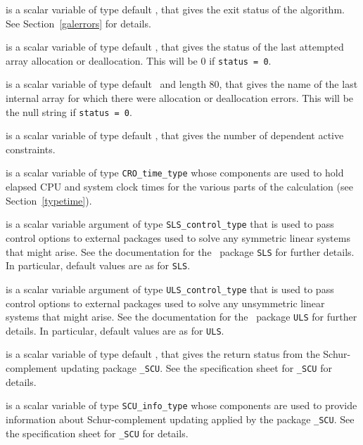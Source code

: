 \documentclass{galahad}
\newcommand{\packagename}{CRO}
\begin{document}
\begin{description}

 is a scalar variable of type default \integer, that gives the
exit status of the algorithm.
See Section~\ref{galerrors}
for details.

 is a scalar variable of type default \integer, that gives
the status of the last attempted array allocation or deallocation.
This will be 0 if {\tt status = 0}.

 is a scalar variable of type default \character\
and length 80, that  gives the name of the last internal array
for which there were allocation or deallocation errors.
This will be the null string if {\tt status = 0}.

 is a scalar variable of type default \integer, that
gives the number of dependent active constraints.

 is a scalar variable of type {\tt \packagename\_time\_type}
whose components are used to hold elapsed CPU and system clock times for the
various parts of the calculation (see Section~\ref{typetime}).

 is a scalar variable argument of type
{\tt SLS\_control\_type} that is used to pass control
options to external packages used to solve any symmetric
linear systems that might arise.
See the documentation for the \galahad\ package {\tt SLS} for further details.
In particular, default values are as for {\tt SLS}.

 is a scalar variable argument of type
{\tt ULS\_control\_type} that is used to pass control
options to external packages used to solve any unsymmetric
linear systems that might arise.
See the documentation for the \galahad\ package {\tt ULS} for further details.
In particular, default values are as for {\tt ULS}.

 is a scalar variable of type default \integer, that
gives the return status from the Schur-complement updating package
{\tt \libraryname\_SCU}.
See the specification sheet for {\tt \libraryname\_SCU} for details.

 is a scalar variable of type
{\tt SCU\_info\_type}
whose components are used to provide information about
Schur-complement updating applied by the package
{\tt \libraryname\_SCU}.
See the specification sheet for {\tt \libraryname\_SCU} for details.

\end{description}
\end{document}

